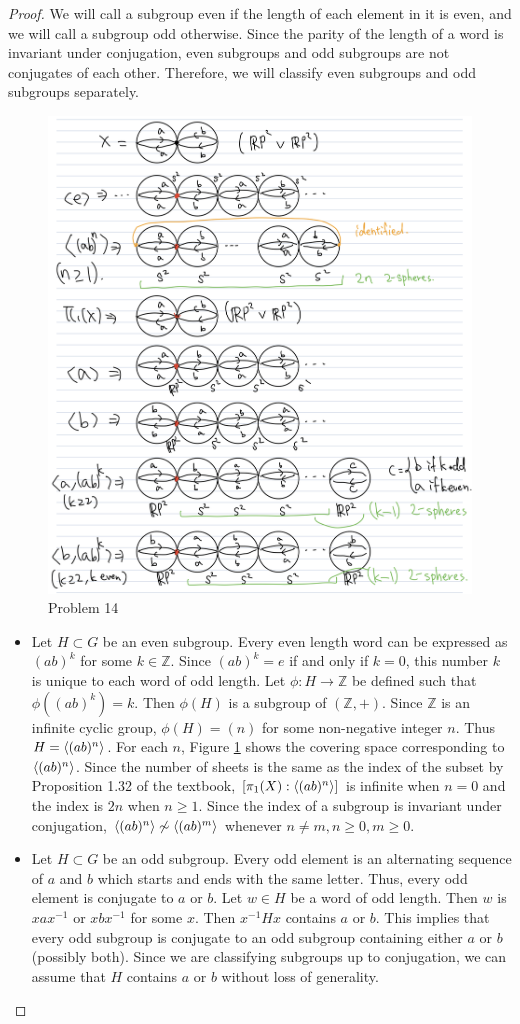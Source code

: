 \documentclass[12pt, psamsfonts]{amsart}
\theoremstyle{definition}
\theoremstyle{remark}
\numberwithin{equation}{section}
\begin{document}
\begin{proof}
  We will call a subgroup even if the length of each element in it is even, and we will call a subgroup odd otherwise.
  Since the parity of the length of a word is invariant under conjugation, even subgroups and odd subgroups are not conjugates of each other.
  Therefore, we will classify even subgroups and odd subgroups separately.
  \begin{figure}
    \includegraphics[width=.7\linewidth]{problem14_classification.jpeg}
      \caption{Problem 14}
    \label{fig:problem14}
  \end{figure}

  \begin{itemize}
    \item
      Let $H \subset G$ be an even subgroup.
      Every even length word can be expressed as $(ab)^k$ for some $k \in \mathbb{Z}$.
      Since $(ab)^k = e$ if and only if $k = 0$, this number $k$ is unique to each word of odd length.
      Let $\phi: H \rightarrow \mathbb{Z}$ be defined such that $\phi((ab)^k) = k$.
      Then $\phi(H)$ is a subgroup of $(\mathbb{Z}, +)$.
      Since $\mathbb{Z}$ is an infinite cyclic group, $\phi(H) = (n)$ for some non-negative integer $n$.
      Thus $H = \ev{(ab)^n}$.
      For each $n$, Figure \ref{fig:problem14} shows the covering space corresponding to $\ev{(ab)^n}$.
      Since the number of sheets is the same as the index of the subset by Proposition 1.32 of the textbook, $[\pi_1(X):\ev{(ab)^n}]$ is infinite when $n = 0$ and the index is $2n$ when $n \geq 1$.
      Since the index of a subgroup is invariant under conjugation, $\ev{(ab)^n} \not\sim \ev{(ab)^m}$ whenever $n \ne m, n \geq 0, m \geq 0$.
    \item
      Let $H \subset G$ be an odd subgroup.
      Every odd element is an alternating sequence of $a$ and $b$ which starts and ends with the same letter.
      Thus, every odd element is conjugate to $a$ or $b$.
      Let $w \in H$ be a word of odd length.
      Then $w$ is $xax^{-1}$ or $xbx^{-1}$ for some $x$.
      Then $x^{-1}Hx$ contains $a$ or $b$.
      This implies that every odd subgroup is conjugate to an odd subgroup containing either $a$ or $b$ (possibly both).
      Since we are classifying subgroups up to conjugation, we can assume that $H$ contains $a$ or $b$ without loss of generality.


\end{itemize}
\end{proof}
\end{document}
